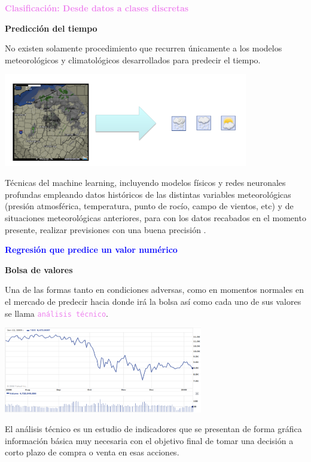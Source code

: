 \documentclass[11pt]{beamer}
\begin{document}
\begin{frame}{\textbf{\textcolor{violet}{Clasificaci\'on: Desde datos a clases discretas}} }
	\vspace{0.2cm}
	
	\textbf{Predicci\'on del tiempo}
	
	\scriptsize{No existen solamente procedimiento que recurren  \'unicamente a los modelos meteorol\'ogicos y climatol\'ogicos desarrollados para predecir el tiempo.
		
	\centering
	\includegraphics[width=0.8\textwidth]{ML3.png}	
	
 T\'ecnicas del machine learning, incluyendo modelos f\'isicos y redes neuronales profundas  empleando datos  hist\'oricos de las distintas variables meteorol\'ogicas (presi\'on atmosf\'erica, temperatura, punto de roc\'io, campo de vientos, etc) y de situaciones meteorol\'ogicas anteriores, para con los datos recabados en el momento presente, realizar previsiones con una buena precisi\'on .
	}
\end{frame}
\begin{frame}{\textbf{\textcolor{blue}{Regresi\'on que predice un valor num\'erico}}}
\vspace{0.2cm}
	
\textbf{Bolsa de valores}
	
\scriptsize{Una de las formas tanto en condiciones adversas, como en momentos normales en el mercado de predecir hacia donde ir\'a la bolsa as\'i como cada uno de sus valores se llama \texttt{\textcolor{violet}{an\'alisis t\'ecnico}}.

\vspace{0.3cm}

\centering
\includegraphics[width=0.65\textwidth]{ML4.png}	

\vspace{0.3cm}
	
El an\'alisis t\'ecnico es un  estudio  de indicadores que se  presentan de forma gr\'afica informaci\'on b\'asica muy necesaria con el objetivo final de tomar una decisi\'on a corto plazo de compra o venta en esas acciones.}
\end{frame}
\end{document}
